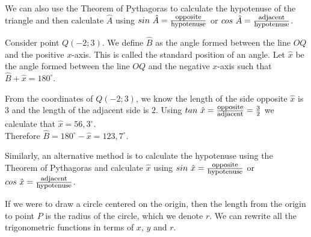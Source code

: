 We can also use the Theorem of Pythagoras to calculate the hypotenuse of the triangle and then calculate $\hat{A}$ using $sin~\hat{A} = \frac{\mbox{\footnotesize opposite}}{\mbox{\footnotesize hypotenuse}}$ or $cos~\hat{A} = \frac{\mbox{\footnotesize adjacent}}{\mbox{\footnotesize hypotenuse}}$. \par
Consider point $Q(-2;3)$. We define $\hat{B}$ as the angle formed between the line $OQ$ and the positive $x$-axis. This is called the standard position of an angle. Let $\hat{x}$ be the angle formed between the line $OQ$ and the negative $x$-axis such that $\hat{B} + \hat{x} = 180^{\circ}$.
\par

From the coordinates of $Q(-2;3)$, we know the length of the side opposite $\hat{x}$ is $3$ and the length of the adjacent side is $2$. Using $tan~\hat{x}=\frac{\mbox{\footnotesize opposite}}{\mbox{\footnotesize adjacent}} = \frac{3}{2}$ we calculate that $\hat{x}=56,3^{\circ}$.
\\Therefore $\hat{B}=180^{\circ} - \hat{x} = 123,7^{\circ}$.\par

Similarly, an alternative method is to calculate the hypotenuse using the Theorem of Pythagoras and calculate $\hat{x}$ using $sin~\hat{x} = \frac{\mbox{\footnotesize opposite}}{\mbox{\footnotesize hypotenuse}}$ or $cos~\hat{x} = \frac{\mbox{\footnotesize adjacent}}{\mbox{\footnotesize hypotenuse}}$. \par
If we were to draw a circle centered on the origin, then the length from the origin to point $P$ is the radius of the circle, which we denote $r$. We can rewrite all the trigonometric functions in terms of $x$, $y$ and $r$.



